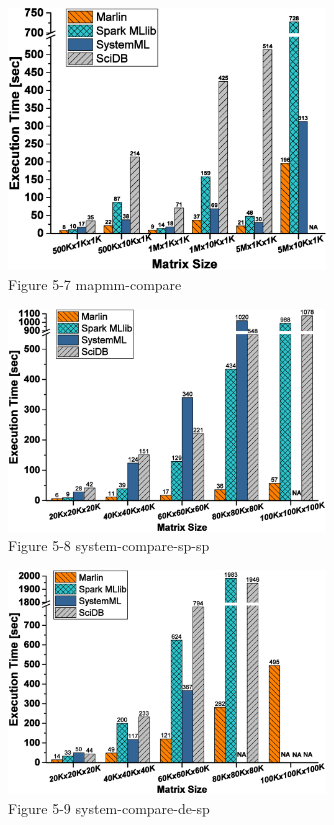 \documentclass[onecolumn]{ieeetran}
\begin{document}
\begin{figure}[ht]
  \centering\captionsetup{justification=centering}
  \includegraphics[width=0.75\textwidth]{Figure_5-7_mapmm-compare.eps}
  \caption{Figure 5-7 mapmm-compare}\label{Figure_5-7_mapmm-compare}
\end{figure}

\begin{figure}[ht]
  \centering\captionsetup{justification=centering}
  \includegraphics[width=0.75\textwidth]{Figure_5-8_system-compare-sp-sp.eps}
  \caption{Figure 5-8 system-compare-sp-sp}\label{Figure_5-8_system-compare-sp-sp}
\end{figure}

\begin{figure}[ht]
  \centering\captionsetup{justification=centering}
  \includegraphics[width=0.75\textwidth]{Figure_5-9_system-compare-de-sp.eps}
  \caption{Figure 5-9 system-compare-de-sp}\label{Figure_5-9_system-compare-de-sp}
\end{figure}
\clearpage
\end{document}
